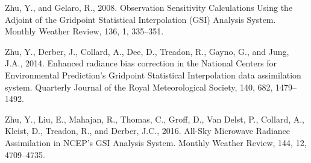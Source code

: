 \documentclass[12pt,oneside,a4paper]{reedthesis}
\begin{document}
\leavevmode\hypertarget{ref-zhu2008}{}%
Zhu, Y., and Gelaro, R., 2008. Observation Sensitivity Calculations Using the Adjoint of the Gridpoint Statistical Interpolation (GSI) Analysis System. Monthly Weather Review, 136, 1, 335--351.

\leavevmode\hypertarget{ref-zhu2014}{}%
Zhu, Y., Derber, J., Collard, A., Dee, D., Treadon, R., Gayno, G., and Jung, J.A., 2014. Enhanced radiance bias correction in the National Centers for Environmental Prediction's Gridpoint Statistical Interpolation data assimilation system. Quarterly Journal of the Royal Meteorological Society, 140, 682, 1479--1492.

\leavevmode\hypertarget{ref-zhu2016}{}%
Zhu, Y., Liu, E., Mahajan, R., Thomas, C., Groff, D., Van Delst, P., Collard, A., Kleist, D., Treadon, R., and Derber, J.C., 2016. All-Sky Microwave Radiance Assimilation in NCEP's GSI Analysis System. Monthly Weather Review, 144, 12, 4709--4735.


\end{document}
